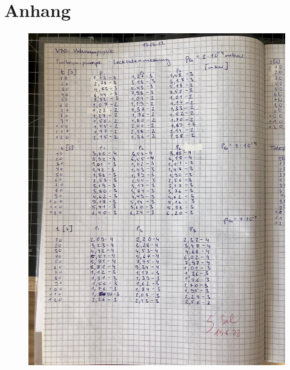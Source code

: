 \section{Anhang}
\label{sec:anhang}

\begin{figure}
    \centering
    \includegraphics[width=\textwidth]{bilder/Anhang1.jpg}

\end{figure}
